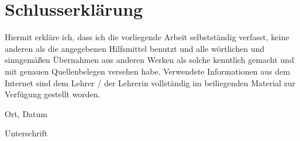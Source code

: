 \section*{Schlusserklärung}

\pagestyle{empty}

Hiermit erkläre ich, dass ich die vorliegende Arbeit selbstständig verfasst, keine anderen als die angegebenen Hilfsmittel benutzt und alle wörtlichen und sinngemäßen Übernahmen aus anderen Werken als solche kenntlich gemacht und mit genauen Quellenbelegen versehen habe.
Verwendete Informationen aus dem Internet sind dem Lehrer / der Lehrerin vollständig im beiliegenden Material zur Verfügung gestellt worden.

{\raggedright
\vspace{0.7cm}

\underline{\hspace{5cm}}
Ort, Datum 

\vspace{0.7cm}

\underline{\hspace{5cm}}
Unterschrift }
